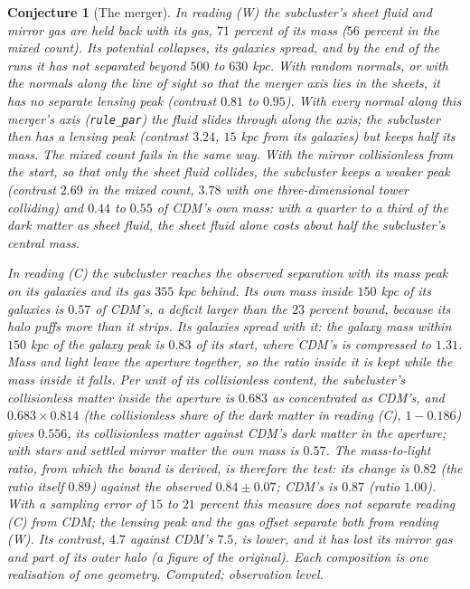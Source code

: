 \documentclass[11pt]{article}
\newtheorem{conjecture}[theorem]{Conjecture}
\theoremstyle{definition}
\theoremstyle{plain}
\begin{document}
\begin{conjecture}[The merger]\label{c:simulations.merger}
In reading (W) the subcluster's sheet fluid and mirror gas are held back with its gas, $71$ percent of its mass ($56$ percent in the mixed count). Its potential collapses, its galaxies spread, and by the end of the runs it has not separated beyond $500$ to $630$ kpc. With random normals, or with the normals along the line of sight so that the merger axis lies in the sheets, it has no separate lensing peak (contrast $0.81$ to $0.95$). With every normal along this merger's axis (\texttt{rule\_par}) the fluid slides through along the axis; the subcluster then has a lensing peak (contrast $3.24$, $15$ kpc from its galaxies) but keeps half its mass. The mixed count fails in the same way. With the mirror collisionless from the start, so that only the sheet fluid collides, the subcluster keeps a weaker peak (contrast $2.69$ in the mixed count, $3.78$ with one three-dimensional tower colliding) and $0.44$ to $0.55$ of CDM's own mass: with a quarter to a third of the dark matter as sheet fluid, the sheet fluid alone costs about half the subcluster's central mass.

In reading (C) the subcluster reaches the observed separation with its mass peak on its galaxies and its gas $355$ kpc behind. Its own mass inside $150$ kpc of its galaxies is $0.57$ of CDM's, a deficit larger than the $23$ percent bound, because its halo puffs more than it strips. Its galaxies spread with it: the galaxy mass within $150$ kpc of the galaxy peak is $0.83$ of its start, where CDM's is compressed to $1.31$. Mass and light leave the aperture together, so the ratio inside it is kept while the mass inside it falls. Per unit of its collisionless content, the subcluster's collisionless matter inside the aperture is $0.683$ as concentrated as CDM's, and $0.683 \times 0.814$ (the collisionless share of the dark matter in reading (C), $1 - 0.186$) gives $0.556$, its collisionless matter against CDM's dark matter in the aperture; with stars and settled mirror matter the own mass is $0.57$. The mass-to-light ratio, from which the bound is derived, is therefore the test: its change is $0.82$ (the ratio itself $0.89$) against the observed $0.84 \pm 0.07$; CDM's is $0.87$ (ratio $1.00$). With a sampling error of $15$ to $21$ percent this measure does not separate reading (C) from CDM; the lensing peak and the gas offset separate both from reading (W). Its contrast, $4.7$ against CDM's $7.5$, is lower, and it has lost its mirror gas and part of its outer halo (a figure of the original). Each composition is one realisation of one geometry. Computed; observation level.
\end{conjecture}
\end{document}
